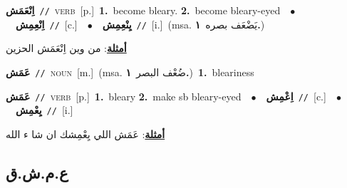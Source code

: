 \documentclass[10pt,a4paper,twoside]{article} %
\begin{document}
\begin{multicols}{2}
{\setlength\topsep{0pt}\textbf{\foreignlanguage{arabic}{اِنْعَمَش}}\ {\color{gray}\texttt{//}\color{black}}\ \textsc{verb}\ [p.]\ \textbf{1.}~become bleary.  \textbf{2.}~become bleary-eyed\ \ $\bullet$\ \ \setlength\topsep{0pt}\textbf{\foreignlanguage{arabic}{اِنْعِمِش}}\ {\color{gray}\texttt{//}\color{black}}\ [c.]\ \ $\bullet$\ \ \setlength\topsep{0pt}\textbf{\foreignlanguage{arabic}{يِنْعِمِش}}\ {\color{gray}\texttt{//}\color{black}}\ [i.]\ \color{gray}(msa. \foreignlanguage{arabic}{يَضْعَف بصره}~\foreignlanguage{arabic}{\textbf{١.}})\color{black}\  \begin{flushright}\color{gray}\foreignlanguage{arabic}{\textbf{\underline{\foreignlanguage{arabic}{أمثلة}}}: من وين اِنْعَمَش الحزين}\end{flushright}\color{black}} \vspace{2mm}

{\setlength\topsep{0pt}\textbf{\foreignlanguage{arabic}{عَمَش}}\ {\color{gray}\texttt{//}\color{black}}\ \textsc{noun}\ [m.]\ \color{gray}(msa. \foreignlanguage{arabic}{ضُعْف البصر}~\foreignlanguage{arabic}{\textbf{١.}})\color{black}\ \textbf{1.}~bleariness\ } \vspace{2mm}

{\setlength\topsep{0pt}\textbf{\foreignlanguage{arabic}{عَمَش}}\ {\color{gray}\texttt{//}\color{black}}\ \textsc{verb}\ [p.]\ \textbf{1.}~bleary  \textbf{2.}~make sb bleary-eyed\ \ $\bullet$\ \ \setlength\topsep{0pt}\textbf{\foreignlanguage{arabic}{اِعْمِش}}\ {\color{gray}\texttt{//}\color{black}}\ [c.]\ \ $\bullet$\ \ \setlength\topsep{0pt}\textbf{\foreignlanguage{arabic}{يِعْمِش}}\ {\color{gray}\texttt{//}\color{black}}\ [i.]\  \begin{flushright}\color{gray}\foreignlanguage{arabic}{\textbf{\underline{\foreignlanguage{arabic}{أمثلة}}}: عَمَش اللي يِعْمِشك ان شا ء الله}\end{flushright}\color{black}} \vspace{2mm}

\vspace{-3mm}
\subsection*{\color{blue}\foreignlanguage{arabic}{ع.م.ش.ق}\color{blue}{}} 


\end{multicols}
\end{document}
